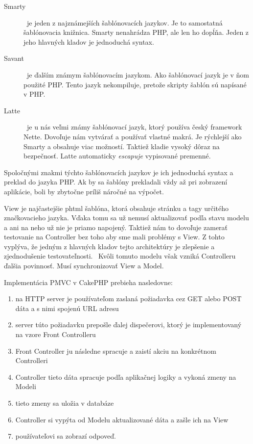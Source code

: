 \documentclass[12pt,oneside]{book}
\begin{document}
\begin{description}
\item [Smarty] \cite{Smarty}\  je jeden z najznámejších šablónovacích jazykov. Je to samostatná šablónovacia knižnica. Smarty nenahrádza PHP, ale len ho dopĺňa. Jeden z jeho hlavných kladov je jednoduchá syntax.
\item [Savant] \cite{Savant}\  je ďalším známym šablónovacím jazykom. Ako šablónovací jazyk je v ňom použité PHP. Tento jazyk nekompiluje, pretože skripty šablón sú napísané v PHP.
\item [Latte] \cite{Latte}\  je u nás veľmi známy šablónovací jazyk, ktorý používa český framework Nette. Dovoľuje nám vytvárať a používať vlastné makrá. Je rýchlejší ako Smarty a obsahuje viac možností. Taktiež kladie vysoký dôraz na bezpečnosť. Latte automaticky \emph{escapuje} vypisované premenné.
\end{description}

Spoločnými znakmi týchto šablónovacích jazykov je ich jednoduchá syntax a preklad do jazyka PHP. Ak by sa šablóny prekladali vždy až pri zobrazení aplikácie, boli by zbytočne príliš náročné na výpočet.
\newline

View je najčastejšie phtml šablóna, ktorá obsahuje stránku a tagy určitého značkovacieho jazyka. Vďaka tomu sa už nemusí aktualizovať podľa stavu modelu a ani na neho už nie je priamo napojený. Taktiež nám to dovoľuje zamerať testovanie na Controller bez toho aby sme mali problémy s View. Z tohto vyplýva, že jedným z hlavných kladov tejto architektúry je zlepšenie a zjednodušenie testovateľnosti. \cite{PMVC}\  Kvôli tomuto modelu však vzniká Controlleru ďalšia povinnosť. Musí synchronizovať View a Model. 
\newline

Implementácia PMVC v CakePHP prebieha nasledovne:

\begin{enumerate}
\item na HTTP server je používateľom zaslaná požiadavka cez GET alebo POST dáta a s nimi spojenú URL adresu
\item server túto požiadavku prepošle ďalej dispečerovi, ktorý je implementovaný na vzore Front Controlleru
\item Front Controller ju následne spracuje a zaistí akciu na konkrétnom Controlleri
\item Controller tieto dáta spracuje podľa aplikačnej logiky a vykoná zmeny na Modeli
\item tieto zmeny sa uložia v databáze 
\item Controller si vypýta od Modelu aktualizované dáta a zašle ich na View
\item používateľovi sa zobrazí odpoveď.
\end{enumerate}
 
\end{document}
